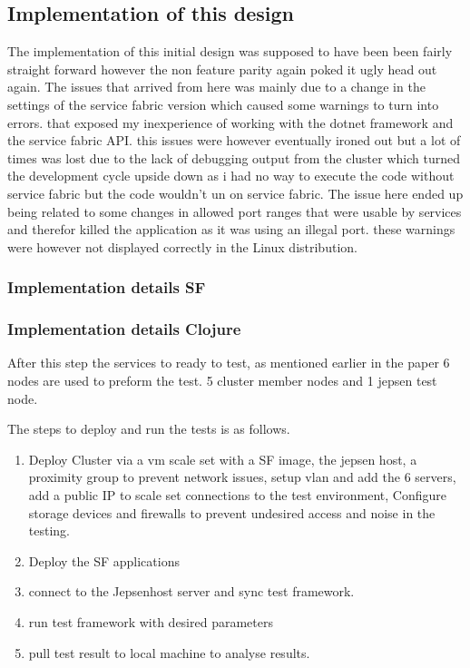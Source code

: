 \documentclass[a4paper,10pt,titlepage]{report}
\begin{document}
    \subsection{Implementation of this design}


    The implementation of this initial design was supposed to have been been fairly straight forward however the non feature parity again poked it ugly head out again. The issues that arrived from here was mainly due to a change in the settings of the service fabric version which caused some warnings to turn into errors. that exposed my inexperience of working with the dotnet framework and the service fabric API. this issues were however eventually ironed out but a lot of times was lost due to the lack of debugging output from the cluster which turned the development cycle upside down as i had no way to execute the code without service fabric but the code wouldn't un on service fabric. The issue here ended up being related to some changes in allowed port ranges that were usable by services and therefor killed the application as it was using an illegal port. these warnings were however not displayed correctly in the Linux distribution.

    \subsubsection{Implementation details SF}

    \subsubsection{Implementation details Clojure}



    After this step the services to ready to test, as mentioned earlier in the paper 6 nodes are used to preform the test. 5 cluster member nodes and 1 jepsen test node.

    The steps to deploy and run the tests is as follows.

    \begin{enumerate}
        \item Deploy Cluster via a vm scale set with a SF image, the jepsen host, a proximity group to prevent network issues, setup vlan and add the 6 servers, add a public IP to scale set connections to the test environment, Configure storage devices and firewalls to prevent undesired access and noise in the testing.
        \item Deploy the SF applications
        \item connect to the Jepsenhost server and sync test framework.
        \item run test framework with desired parameters
        \item pull test result to local machine to analyse results.
    \end{enumerate}
\end{document}
